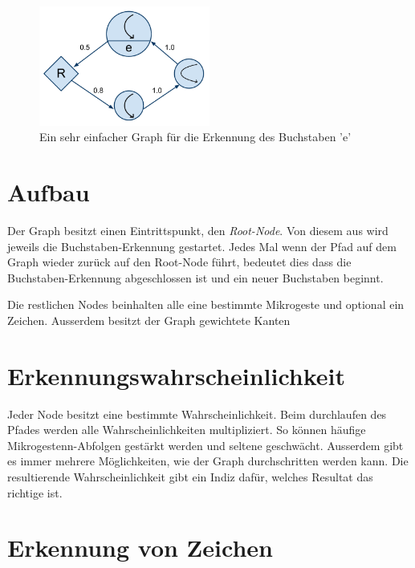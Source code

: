 \begin{figure}[h!]
  \centering
    \includegraphics[width=0.5\textwidth]{./img/BeispielGraph.pdf}
  \caption{Ein sehr einfacher Graph für die Erkennung des Buchstaben 'e'}
  \label{beispiel_graph}
\end{figure}

\section{Aufbau}
Der Graph besitzt einen Eintrittspunkt, den \emph{Root-Node}. Von diesem aus wird jeweils die Buchstaben-Erkennung gestartet. Jedes Mal wenn der Pfad auf dem Graph wieder zurück auf den Root-Node führt, bedeutet dies dass die Buchstaben-Erkennung abgeschlossen ist und ein neuer Buchstaben beginnt. 

Die restlichen Nodes beinhalten alle eine bestimmte Mikrogeste und optional ein Zeichen. Ausserdem besitzt der Graph gewichtete Kanten

\section{Erkennungswahrscheinlichkeit}
Jeder Node besitzt eine bestimmte Wahrscheinlichkeit. Beim durchlaufen des Pfades werden alle Wahrscheinlichkeiten multipliziert. So können häufige Mikrogestenn-Abfolgen gestärkt werden und seltene geschwächt. Ausserdem gibt es immer mehrere Möglichkeiten, wie der Graph durchschritten werden kann. Die resultierende Wahrscheinlichkeit gibt ein Indiz dafür, welches Resultat das richtige ist.

\section{Erkennung von Zeichen}